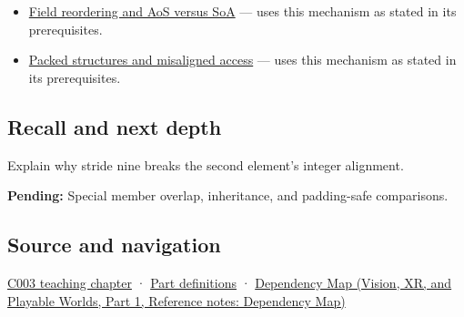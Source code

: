 \begin{itemize}
\tightlist
\item
  \hyperref[appendix-5522ad176ca0]{Field reordering and AoS versus SoA} --- uses this mechanism as stated in its prerequisites.
\item
  \hyperref[appendix-0682dbfc5f0e]{Packed structures and misaligned access} --- uses this mechanism as stated in its prerequisites.
\end{itemize}

\subsection{Recall and next depth}\label{appendix-f52f8c5a3afd-recall-and-next-depth}

\hypertarget{appendix-f52f8c5a3afd-recall-and-next-depth}{}

Explain why stride nine breaks the second element's integer alignment.

\textbf{Pending:} Special member overlap, inheritance, and padding-safe comparisons.

\subsection{Source and navigation}\label{appendix-f52f8c5a3afd-source-and-navigation}

\hypertarget{appendix-f52f8c5a3afd-source-and-navigation}{}

\hyperref[01-foundations-i-ch002-where-the-bytes-live]{C003 teaching chapter} · \hyperref[appendix-fd090d982a15-m003---parts-41-60]{Part definitions} · \href{../07-Vision-XR-and-Playable-Worlds-P01/main.pdf\#nameddest=appendix-4ad47bdd269a}{Dependency Map (Vision, XR, and Playable Worlds, Part 1, Reference notes: Dependency Map)}
